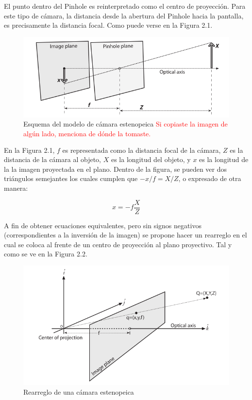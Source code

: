 \documentclass{book}
\begin{document}
El punto dentro del Pinhole es reinterpretado como el centro de proyección. Para este tipo de cámara, la distancia desde la abertura del Pinhole hacia la pantalla, es precisamente la distancia focal. Como puede verse en la Figura 2.1.\\
	
\begin{figure}
	\centering		
	\includegraphics[scale=0.4]{images/pinhole.png}
	\caption{Esquema del modelo de cámara estenopeica  \textcolor{red}{Si copiaste la imagen de algún lado, menciona de dónde la tomaste.}}		
\end{figure}

En la Figura 2.1, $f$ es representada como la distancia focal de la cámara, $Z$ es la distancia de la cámara al objeto, $X$ es la longitud del objeto, y $x$ es la longitud de la la imagen proyectada en el plano. Dentro de la figura, se pueden ver dos triángulos semejantes los cuales cumplen que $-x/f = X/Z$, o expresado de otra manera:

\[x = -f \frac{X}{Z}\]
	
A fin de obtener ecuaciones equivalentes, pero sin signos negativos (correspondientes a la inversión de la imagen) se propone hacer un rearreglo en el cual se coloca al frente de un centro de proyección al plano proyectivo. Tal y como se ve en la Figura 2.2.
	
\begin{figure}
	\centering
	\includegraphics[scale=0.4]{images/rearreglo_pinhole.png}
    \caption{Rearreglo de una cámara estenopeica}
\end{figure} 
\end{document}
